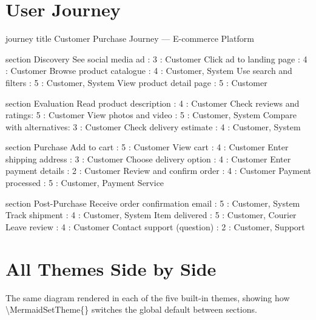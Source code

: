 \documentclass[12pt, a4paper]{article}
\newcommand{\pkg}[1]{{\ttfamily\color{mmd-ocean-accent}#1}}
\begin{document}
\section{User Journey}

\begin{mermaid}[
    type    = journey,
    theme   = ocean,
    caption = {Customer journey — discovering and purchasing a product online},
    label   = {fig:journey},
    width   = \linewidth
]
journey
    title Customer Purchase Journey — E-commerce Platform

    section Discovery
        See social media ad      : 3 : Customer
        Click ad to landing page : 4 : Customer
        Browse product catalogue : 4 : Customer, System
        Use search and filters   : 5 : Customer, System
        View product detail page : 5 : Customer

    section Evaluation
        Read product description : 4 : Customer
        Check reviews and ratings: 5 : Customer
        View photos and video    : 5 : Customer, System
        Compare with alternatives: 3 : Customer
        Check delivery estimate  : 4 : Customer, System

    section Purchase
        Add to cart              : 5 : Customer
        View cart                : 4 : Customer
        Enter shipping address   : 3 : Customer
        Choose delivery option   : 4 : Customer
        Enter payment details    : 2 : Customer
        Review and confirm order : 4 : Customer
        Payment processed        : 5 : Customer, Payment Service

    section Post-Purchase
        Receive order confirmation email : 5 : Customer, System
        Track shipment               : 4 : Customer, System
        Item delivered               : 5 : Customer, Courier
        Leave review                 : 4 : Customer
        Contact support (question)   : 2 : Customer, Support
\end{mermaid}

\section{All Themes Side by Side}

The same diagram rendered in each of the five built-in themes,
showing how \pkg{\textbackslash MermaidSetTheme\{\}} switches
the global default between sections.
\end{document}
